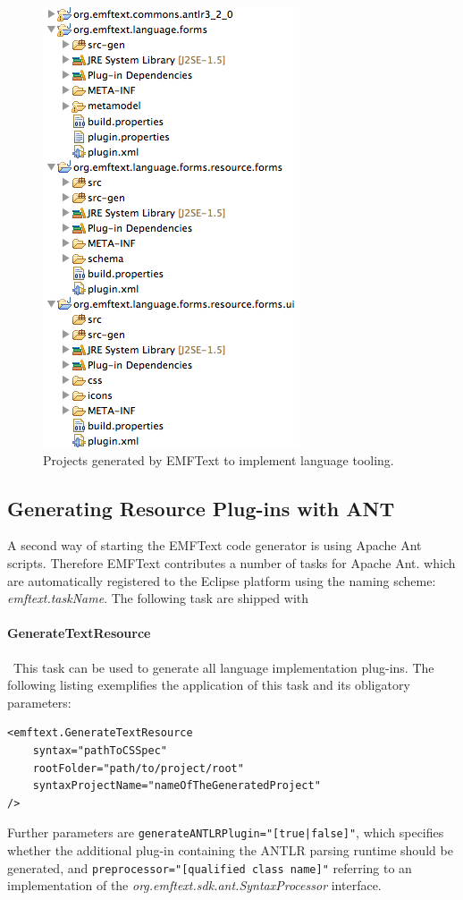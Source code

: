 	\begin{figure}[ht]
	\centering
		\includegraphics[scale=0.7]{figures/generationResults}
	\caption{Projects generated by EMFText to implement language tooling.}
	\label{fig:wizard}
	\end{figure}

	\subsection{Generating Resource Plug-ins with ANT}
	\label{sec:process_generating_ant}
	A second way of starting the EMFText code generator is using Apache Ant
	scripts. Therefore EMFText contributes a number of tasks for Apache Ant.
	which are automatically registered to the Eclipse platform using the
	naming scheme: \emph{emftext.taskName}. The following task are shipped with
	
	\paragraph*{GenerateTextResource}~This task can be used to generate all
	language implementation plug-ins. The following listing exemplifies the
	application of this task and its obligatory parameters:
\begin{lstlisting}
<emftext.GenerateTextResource
	syntax="pathToCSSpec"
	rootFolder="path/to/project/root"
	syntaxProjectName="nameOfTheGeneratedProject"
/>
\end{lstlisting}
	Further parameters are \texttt{generateANTLRPlugin="[true|false]"}, which
	specifies whether the additional plug-in
	containing the ANTLR parsing runtime should be generated, and
	\texttt{pre\-processor="[qualified class name]"} referring to an implementation
	of the \emph{org.emftext.sdk.\-ant.Syntax\-Processor} interface. 
	
